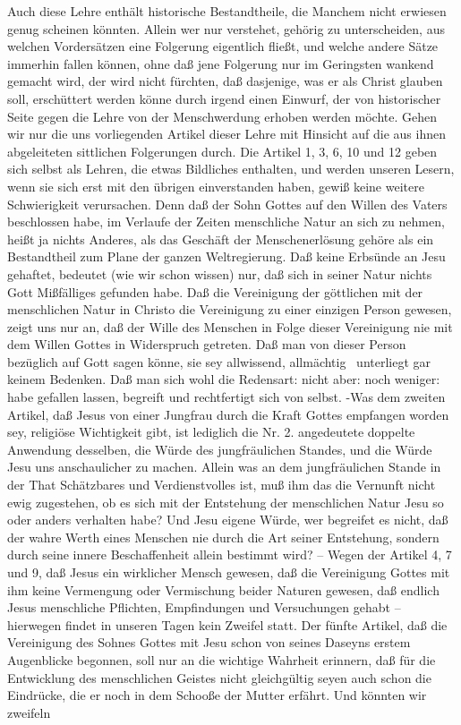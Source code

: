 Auch diese Lehre enthält historische Bestandtheile, die Manchem nicht erwiesen genug scheinen könnten. Allein wer nur verstehet, gehörig zu unterscheiden, aus welchen Vordersätzen eine Folgerung eigentlich fließt, und welche andere Sätze immerhin fallen können, ohne daß jene Folgerung nur im Geringsten wankend gemacht wird, der wird nicht fürchten,  daß dasjenige, was er als Christ glauben soll, erschüttert werden könne durch irgend einen Einwurf, der von historischer Seite gegen die Lehre von der Menschwerdung erhoben werden möchte. Gehen wir nur die uns vorliegenden Artikel dieser Lehre mit Hinsicht auf die  aus ihnen abgeleiteten sittlichen Folgerungen durch. Die Artikel 1, 3, 6, 10 und 12 geben sich selbst als Lehren, die etwas Bildliches enthalten, und werden unseren Lesern, wenn sie sich erst mit den übrigen einverstanden haben, gewiß keine weitere Schwierigkeit verursachen. Denn daß der Sohn Gottes auf den Willen des Vaters beschlossen habe, im Verlaufe der Zeiten menschliche Natur an sich zu nehmen, heißt ja nichts Anderes, als das Geschäft der Menschenerlösung gehöre als ein Bestandtheil zum Plane der ganzen Weltregierung. Daß keine Erbsünde an Jesu gehaftet, bedeutet (wie wir schon wissen) nur, daß sich in seiner Natur nichts Gott Mißfälliges gefunden habe. Daß die Vereinigung der göttlichen mit der menschlichen Natur in Christo die Vereinigung zu einer einzigen Person gewesen, zeigt uns nur an, daß der Wille des Menschen in Folge dieser Vereinigung nie mit dem Willen Gottes in Widerspruch getreten. Daß man von dieser Person bezüglich auf Gott sagen könne, sie sey allwissend, allmächtig \usw\, unterliegt gar keinem Bedenken. Daß man sich wohl die Redensart:  nicht aber:  noch weniger:  habe gefallen lassen, begreift und rechtfertigt sich von selbst. -Was dem zweiten Artikel, daß Jesus von einer Jungfrau durch die Kraft Gottes empfangen worden sey, religiöse Wichtigkeit gibt, ist lediglich die  Nr. 2. angedeutete doppelte Anwendung desselben, die Würde des jungfräulichen Standes, und die Würde Jesu uns anschaulicher zu machen. Allein was an dem jungfräulichen Stande in der That Schätzbares und Verdienstvolles ist, muß ihm das die Vernunft nicht ewig zugestehen, ob es sich mit der Entstehung der menschlichen Natur Jesu so oder anders verhalten habe? Und Jesu eigene Würde, wer begreifet es nicht, daß der wahre Werth eines Menschen nie durch die Art seiner Entstehung, sondern durch  seine innere Beschaffenheit allein bestimmt wird? -- Wegen der Artikel 4, 7 und 9, daß Jesus ein wirklicher Mensch gewesen, daß die Vereinigung Gottes mit ihm keine Vermengung oder Vermischung beider Naturen gewesen, daß endlich Jesus menschliche Pflichten, Empfindungen und Versuchungen gehabt -- hierwegen findet in unseren Tagen kein Zweifel statt. Der fünfte Artikel, daß die Vereinigung des Sohnes Gottes mit Jesu schon von seines Daseyns erstem Augenblicke begonnen, soll nur an die wichtige Wahrheit erinnern, daß für die Entwicklung des menschlichen Geistes nicht gleichgültig seyen auch schon die Eindrücke, die er noch in dem Schooße der Mutter erfährt. Und könnten wir zweifeln 